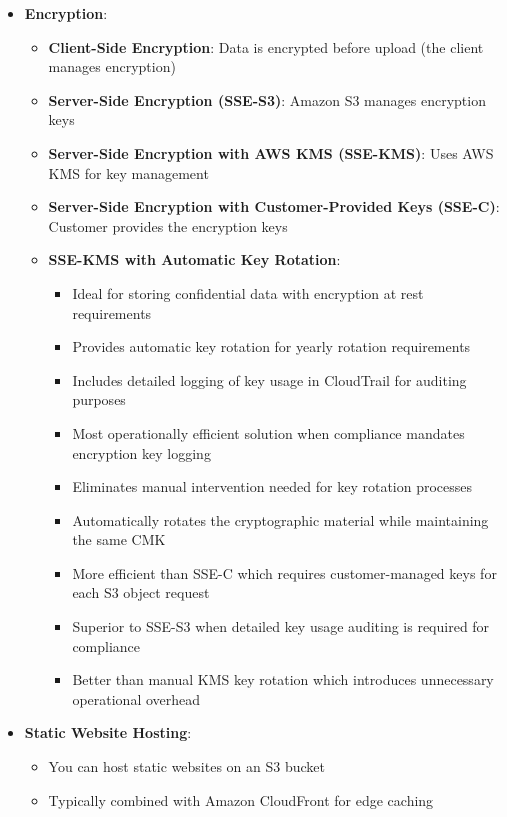\documentclass[11pt,a4paper]{report}
\begin{document}
\begin{itemize}
\begin{itemize}
\begin{itemize}
  \item Superior to using Snowball Edge or EC2-based solutions for regular transfers of moderate data volumes (e.g., 500GB per site)
\end{itemize}
\end{itemize}
  \item \textbf{Encryption}:
\begin{itemize}
  \item \textbf{Client-Side Encryption}: Data is encrypted before upload (the client manages encryption)
  \item \textbf{Server-Side Encryption (SSE-S3)}: Amazon S3 manages encryption keys
  \item \textbf{Server-Side Encryption with AWS KMS (SSE-KMS)}: Uses AWS KMS for key management
  \item \textbf{Server-Side Encryption with Customer-Provided Keys (SSE-C)}: Customer provides the encryption keys
  \item \textbf{SSE-KMS with Automatic Key Rotation}:
\begin{itemize}
  \item Ideal for storing confidential data with encryption at rest requirements
  \item Provides automatic key rotation for yearly rotation requirements
  \item Includes detailed logging of key usage in CloudTrail for auditing purposes
  \item Most operationally efficient solution when compliance mandates encryption key logging
  \item Eliminates manual intervention needed for key rotation processes
  \item Automatically rotates the cryptographic material while maintaining the same CMK
  \item More efficient than SSE-C which requires customer-managed keys for each S3 object request
  \item Superior to SSE-S3 when detailed key usage auditing is required for compliance
  \item Better than manual KMS key rotation which introduces unnecessary operational overhead
\end{itemize}
\end{itemize}
  \item \textbf{Static Website Hosting}:
\begin{itemize}
  \item You can host static websites on an S3 bucket
  \item Typically combined with Amazon CloudFront for edge caching

\end{itemize}
\end{itemize}
\end{document}
